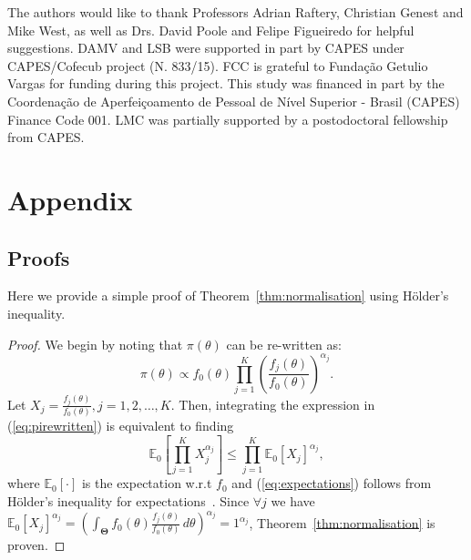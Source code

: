 \documentclass[a4paper, notitlepage, 10pt]{article}
\begin{document}
The authors would like to thank Professors Adrian Raftery, Christian Genest and Mike West, as well as  Drs. David Poole and Felipe Figueiredo for helpful suggestions.
DAMV and LSB were supported in part by CAPES under CAPES/Cofecub project (N. 833/15).
FCC is grateful to Funda\c{c}\~ao Getulio Vargas for funding during this 
project.
This study was financed in part by the Coordenação de Aperfeiçoamento de Pessoal de Nível Superior - Brasil (CAPES) Finance Code 001.
LMC was partially supported by a postodoctoral fellowship from CAPES.


\newpage 

\appendix
\section{Appendix}
\renewcommand\thefigure{S\arabic{figure}}    
\setcounter{figure}{0} 

\subsection{Proofs}

Here we provide a simple proof of Theorem~\ref{thm:normalisation} using H\"{o}lder's inequality.
\begin{proof}
We begin by noting that $\pi(\theta)$ can be re-written as:
\begin{equation}
\label{eq:pirewritten}
 \pi(\theta) \propto f_0(\theta)\prod_{j=1}^{K} \left(\frac{f_j(\theta)}{f_0(\theta)}\right)^{\alpha_j}.
\end{equation}
Let $X_j = \frac{f_j(\theta)}{f_0(\theta)}, j=1, 2,\ldots, K$. 
Then, integrating the expression in (\ref{eq:pirewritten}) is equivalent to finding 
\begin{equation}
\label{eq:expectations}
\mathbb{E}_{0}\left[\prod_{j=1}^KX_j^{\alpha_j}\right] \leq \prod_{j=1}^K \mathbb{E}_{0}[X_j]^{\alpha_j},
\end{equation}
where $\mathbb{E}_{0}[\cdot]$ is the expectation w.r.t $f_0$ and (\ref{eq:expectations}) follows from H\"{o}lder's inequality for expectations~\citep{Yeh2011}.
Since $\forall j$ we have $\mathbb{E}_{0}[X_j]^{\alpha_j} = \left(\int_{\boldsymbol\Theta}f_0(\theta)\frac{f_j(\theta)}{f_0(\theta)}\, d\theta\right)^{\alpha_j}=1^{\alpha_j}$, Theorem~\ref{thm:normalisation} is proven.
\end{proof}
\end{document}
